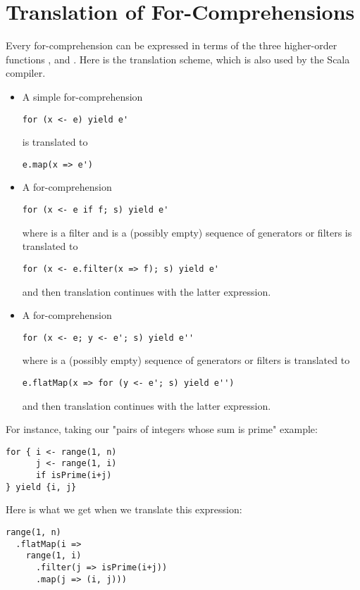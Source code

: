 \section{Translation of For-Comprehensions}

Every for-comprehension can be expressed in terms of the three
higher-order functions ,  and .
Here is the translation scheme, which is also used by the Scala compiler.
\begin{itemize}
\item
A simple for-comprehension
\begin{lstlisting}
for (x <- e) yield e'
\end{lstlisting}
is translated to
\begin{lstlisting}
e.map(x => e')
\end{lstlisting}
\item
A for-comprehension
\begin{lstlisting}
for (x <- e if f; s) yield e'
\end{lstlisting}
where  is a filter and  is a (possibly empty)
sequence of generators or filters
is translated to
\begin{lstlisting}
for (x <- e.filter(x => f); s) yield e'
\end{lstlisting}
and then translation continues with the latter expression.
\item
A for-comprehension
\begin{lstlisting}
for (x <- e; y <- e'; s) yield e''
\end{lstlisting}
where  is a (possibly empty)
sequence of generators or filters
is translated to
\begin{lstlisting}
e.flatMap(x => for (y <- e'; s) yield e'')
\end{lstlisting}
and then translation continues with the latter expression.
\end{itemize}
For instance, taking our "pairs of integers whose sum is prime" example:
\begin{lstlisting}
for { i <- range(1, n)
      j <- range(1, i)
      if isPrime(i+j)
} yield {i, j}
\end{lstlisting}
Here is what we get when we translate this expression:
\begin{lstlisting}
range(1, n)
  .flatMap(i =>
    range(1, i)
      .filter(j => isPrime(i+j))
      .map(j => (i, j)))
\end{lstlisting}

